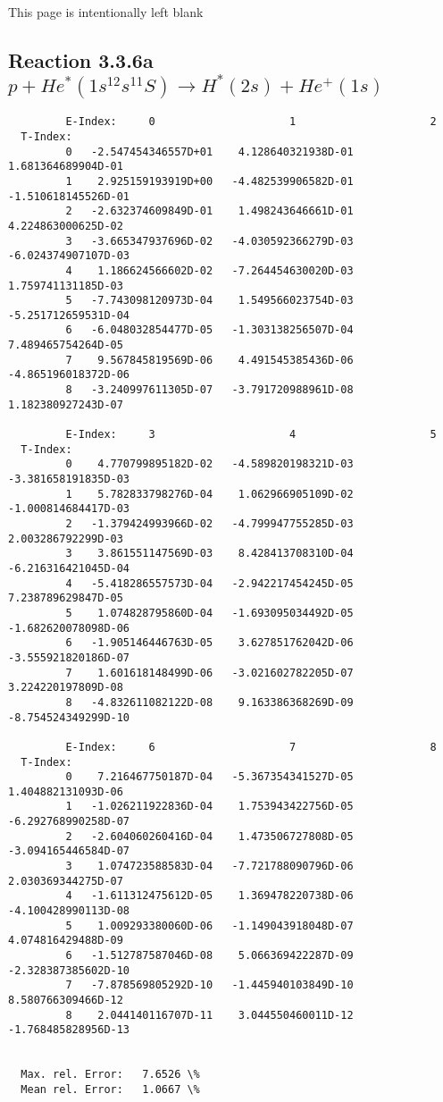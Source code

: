 \documentclass[12pt,dvipdfmx]{article}
\begin{document}
\newpage
This page is intentionally left blank
\newpage
\subsection{
Reaction 3.3.6a  $ p + He^*(1s^12s^11S) \rightarrow H^*(2s) + He^+(1s) $
}


\begin{small}\begin{verbatim}
         E-Index:     0                     1                     2
  T-Index:
         0   -2.547454346557D+01    4.128640321938D-01    1.681364689904D-01
         1    2.925159193919D+00   -4.482539906582D-01   -1.510618145526D-01
         2   -2.632374609849D-01    1.498243646661D-01    4.224863000625D-02
         3   -3.665347937696D-02   -4.030592366279D-03   -6.024374907107D-03
         4    1.186624566602D-02   -7.264454630020D-03    1.759741131185D-03
         5   -7.743098120973D-04    1.549566023754D-03   -5.251712659531D-04
         6   -6.048032854477D-05   -1.303138256507D-04    7.489465754264D-05
         7    9.567845819569D-06    4.491545385436D-06   -4.865196018372D-06
         8   -3.240997611305D-07   -3.791720988961D-08    1.182380927243D-07

         E-Index:     3                     4                     5
  T-Index:
         0    4.770799895182D-02   -4.589820198321D-03   -3.381658191835D-03
         1    5.782833798276D-04    1.062966905109D-02   -1.000814684417D-03
         2   -1.379424993966D-02   -4.799947755285D-03    2.003286792299D-03
         3    3.861551147569D-03    8.428413708310D-04   -6.216316421045D-04
         4   -5.418286557573D-04   -2.942217454245D-05    7.238789629847D-05
         5    1.074828795860D-04   -1.693095034492D-05   -1.682620078098D-06
         6   -1.905146446763D-05    3.627851762042D-06   -3.555921820186D-07
         7    1.601618148499D-06   -3.021602782205D-07    3.224220197809D-08
         8   -4.832611082122D-08    9.163386368269D-09   -8.754524349299D-10

         E-Index:     6                     7                     8
  T-Index:
         0    7.216467750187D-04   -5.367354341527D-05    1.404882131093D-06
         1   -1.026211922836D-04    1.753943422756D-05   -6.292768990258D-07
         2   -2.604060260416D-04    1.473506727808D-05   -3.094165446584D-07
         3    1.074723588583D-04   -7.721788090796D-06    2.030369344275D-07
         4   -1.611312475612D-05    1.369478220738D-06   -4.100428990113D-08
         5    1.009293380060D-06   -1.149043918048D-07    4.074816429488D-09
         6   -1.512787587046D-08    5.066369422287D-09   -2.328387385602D-10
         7   -7.878569805292D-10   -1.445940103849D-10    8.580766309466D-12
         8    2.044140116707D-11    3.044550460011D-12   -1.768485828956D-13


  Max. rel. Error:   7.6526 \%
  Mean rel. Error:   1.0667 \%
\end{verbatim}\end{small}
\end{document}
